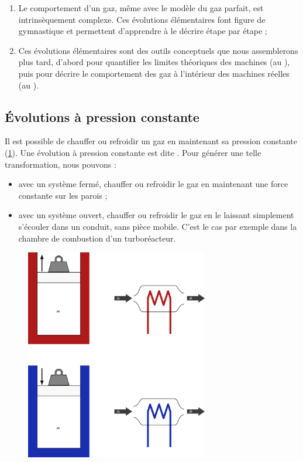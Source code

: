 		\begin{enumerate}
			\item Le comportement d’un gaz, même avec le modèle du gaz parfait, est intrinsèquement complexe. Ces évolutions élémentaires font figure de gymnastique et permettent d’apprendre à le décrire étape par étape ;
			\item Ces évolutions élémentaires sont des outils conceptuels que nous assemblerons plus tard, d’abord pour quantifier les limites théoriques des machines (au \coursseptshort), puis pour décrire le comportement des gaz à l’intérieur des machines réelles (au \coursdixshort).
		\end{enumerate}


	\subsection{Évolutions à pression constante}
	\label{ch_gp_isobares}

		Il est possible de chauffer ou refroidir un gaz en maintenant sa pression constante (\cref{fig_gp_pression_constante}). Une évolution à pression constante est dite . Pour générer une telle transformation, nous pouvons :
		
		\begin{itemize}
			\item avec un système fermé, chauffer ou refroidir le gaz en maintenant une force constante sur les parois ;
			\item avec un système ouvert, chauffer ou refroidir le gaz en le laissant simplement s’écouler dans un conduit, sans pièce mobile. C’est le cas par exemple dans la chambre de combustion d’un turboréacteur.
		\end{itemize}

		\begin{figure}
			\begin{center}
				\includegraphics[width=8cm]{images/pression_constante.png}
			\end{center}
			\label{fig_gp_pression_constante}
		\end{figure}
		
